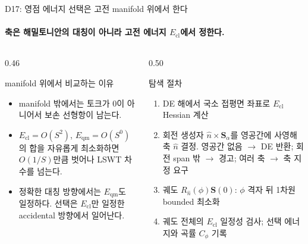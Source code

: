 \begin{frame}[label=state-selection-rule]{D17: 영점 에너지 선택은 고전 manifold 위에서 한다}
  \framesubtitle{축은 해밀토니안의 대칭이 아니라 고전 에너지 $E_{\mathrm{cl}}$에서 정한다.}
  \begin{columns}[T,onlytextwidth]
    \begin{column}{0.46\textwidth}
      \begin{block}{manifold 위에서 비교하는 이유}
        \small
        \begin{itemize}
          \item manifold 밖에서는 토크가 0이 아니어서 보손 선형항이 남는다.
          \item $E_{\mathrm{cl}}=O(S^2)$, $E_{\mathrm{qm}}=O(S^0)$의 합을 자유롭게 최소화하면
            $O(1/S)$만큼 벗어나 LSWT 차수를 넘는다.
          \item 정확한 대칭 방향에서는 $E_{\mathrm{qm}}$도 일정하다.
            선택은 $E_{\mathrm{cl}}$만 일정한 accidental 방향에서 일어난다.
        \end{itemize}
      \end{block}
    \end{column}
    \begin{column}{0.50\textwidth}
      \begin{block}{탐색 절차}
        \small
        \begin{enumerate}
          \item DE 해에서 국소 접평면 좌표로 $E_{\mathrm{cl}}$ Hessian 계산
          \item 회전 생성자 $\hat n\times\mathbf S_\alpha$를 영공간에 사영해 축 $\hat n$ 결정.
            영공간 없음 $\to$ DE 반환; 회전 span 밖 $\to$ 경고;
            여러 축 $\to$ 축 지정 요구
          \item 궤도 $R_{\hat n}(\phi)\mathbf S(0)$: $\phi$ 격자 뒤 1차원 bounded 최소화
          \item 궤도 전체의 $E_{\mathrm{cl}}$ 일정성 검사; 선택 에너지와 곡률 $C_\phi$ 기록
        \end{enumerate}
      \end{block}
    \end{column}
  \end{columns}
  \par\medskip
\end{frame}

